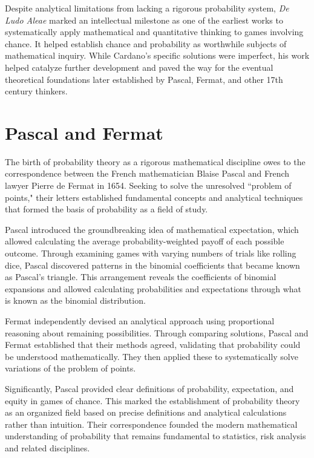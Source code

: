 Despite analytical limitations from lacking a rigorous probability system, \emph{De Ludo Aleae} marked an intellectual milestone as one of the earliest works to systematically apply mathematical and quantitative thinking to games involving chance. It helped establish chance and probability as worthwhile subjects of mathematical inquiry. While Cardano's specific solutions were imperfect, his work helped catalyze further development and paved the way for the eventual theoretical foundations later established by Pascal, Fermat, and other 17th century thinkers. 

\section{Pascal and Fermat}

The birth of probability theory as a rigorous mathematical discipline owes to the correspondence between the French mathematician Blaise Pascal and French lawyer Pierre de Fermat in 1654. Seeking to solve the unresolved ``problem of points," their letters established fundamental concepts and analytical techniques that formed the basis of probability as a field of study. 

Pascal introduced the groundbreaking idea of mathematical expectation, which allowed calculating the average probability-weighted payoff of each possible outcome. Through examining games with varying numbers of trials like rolling dice, Pascal discovered patterns in the binomial coefficients that became known as Pascal's triangle. This arrangement reveals the coefficients of binomial expansions and allowed calculating probabilities and expectations through what is known as the binomial distribution.

Fermat independently devised an analytical approach using proportional reasoning about remaining possibilities. Through comparing solutions, Pascal and Fermat established that their methods agreed, validating that probability could be understood mathematically. They then applied these to systematically solve variations of the problem of points.

Significantly, Pascal provided clear definitions of probability, expectation, and equity in games of chance. This marked the establishment of probability theory as an organized field based on precise definitions and analytical calculations rather than intuition. Their  correspondence founded the modern mathematical understanding of probability that remains fundamental to statistics, risk analysis and related disciplines. 

